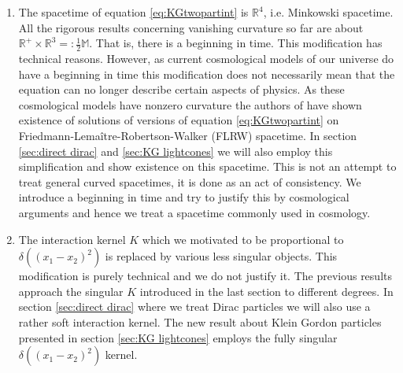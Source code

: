 \documentclass[b5paper,draft,openbib,12pt]{memoir}
\newtheorem{Thm}[Def]{Theorem}
\begin{document}
\begin{enumerate}[label=(\Alph*)]
\item \label{matt simplifying assumption 1} The spacetime of equation \eqref{eq:KGtwopartint} 
is \(\mathbb{R}^4\), i.e. Minkowski spacetime.
All the rigorous results concerning vanishing curvature so far 
are about
\(\mathbb{R}^+\times\mathbb{R}^3=:\frac{1}{2}\mathbb{M}\). 
That is, there is a beginning in time. This modification has 
technical reasons. However, as current 
cosmological models of our universe do have a beginning in 
time this modification does not necessarily
mean that the equation can no longer describe 
certain aspects of physics. As these cosmological models 
have nonzero curvature the authors of \cite{lienertcurved} 
have shown existence of solutions of versions of 
equation \eqref{eq:KGtwopartint}
on Friedmann-Lemaître-Robertson-Walker (FLRW) spacetime. In 
section \ref{sec:direct dirac} and 
\ref{sec:KG lightcones} we will also employ this 
simplification and show existence on this spacetime. This is not 
an attempt to treat 
general curved spacetimes, it is done as an act of consistency. 
We introduce a beginning in time 
and try to justify this by cosmological arguments and hence 
we treat a spacetime commonly used
in cosmology.
\item \label{matt simplifying assumption 2} The interaction kernel \(K\) which we motivated to be 
proportional to \(\delta((x_1-x_2)^2)\)
is replaced by various less singular objects. This modification is 
purely technical and we do not 
justify it. The previous results approach the singular \(K\) 
introduced in the last section to different
degrees. In section \ref{sec:direct dirac} where we treat Dirac 
particles 
we will also use a rather soft interaction kernel. The new result 
about Klein Gordon particles presented in 
section \ref{sec:KG lightcones} employs the fully 
singular \(\delta((x_1-x_2)^2)\) kernel. 
\end{enumerate}

\end{document}
